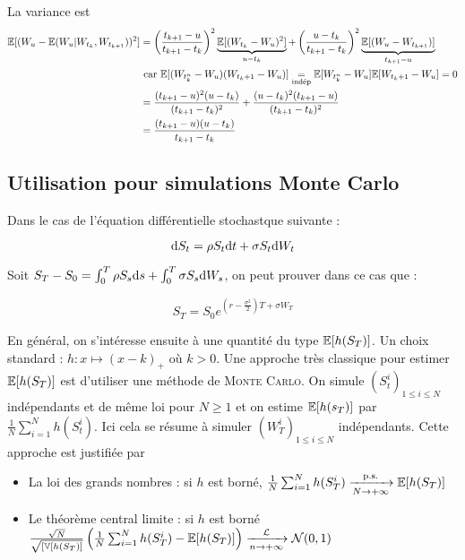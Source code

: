 La variance est 
\begin{equation*}
\begin{split}
  \mathbb{E}[(W_u - \mathbb{E}(W_u \vert W_{t_k}, W_{t_{k+1}}))^2] &= \left(\frac{t_{k+1} - u}{t_{k+1}-t_k}\right)^2  \underbrace{\mathbb{E}[(W_{t_k}-W_u)^2]}_{u-t_k} + \left( \frac{u-t_k}{t_{k+1} - t_k} \right)^2 \underbrace{\mathbb{E}[(W_u-W_{t_{k+1}})]}_{t_{k+1} - u} \\
  &\text{ car } \mathbb{E}[(W_{t_k^n} - W_u)(W_{t_k+1} - W_u)] \underset{\text{indép}}{=} \mathbb{E}[W_{t_k^n} - W_u]\mathbb{E}[W_{t_k+1} - W_u] = 0 \\ 
  &= \frac{(t_{k+1}-u)^2 (u-t_k)}{(t_{k+1} - t_k)^2} + \frac{(u-t_k)^2 (t_{k+1}-u)}{(t_{k+1} - t_k)^2} \\
  &= \frac{(t_{k+1}-u)(u-t_k)}{t_{k+1} - t_k}
\end{split}
\end{equation*}

\subsection{Utilisation pour simulations Monte Carlo}
Dans le cas de l'équation différentielle stochastque suivante :

\[ \mathrm{d} S_t = \rho S_t \mathrm{d} t + \sigma S_t \mathrm{d} W_t \]

Soit $S_T - S_0 = \int_{0}^{T} \rho S_s \mathrm{d} s + \int_{0}^{T} \sigma S_s \mathrm{d} W_s$, on peut prouver dans ce cas que :

\[ S_T = S_0 e^{\left(r- \frac{\sigma^2}{2}\right)T + \sigma W_T} \]

En général, on s'intéresse ensuite à une quantité du type $\mathbb{E}[h(S_T)]$. Un choix standard : $h : x \mapsto (x-k)_+$ où $k>0$. Une approche très classique pour estimer $\mathbb{E}[h(S_T)]$ est d'utiliser une méthode de \textsc{Monte Carlo}. On simule $(S_t^i)_{1\leq i \leq N}$ indépendants et de même loi pour $N \geq 1$ et on estime $\mathbb{E}[h(s_T)]$ par $ \frac{1}{N} \sum_{i=1}^{N} h(S_t^i)$. Ici cela se résume à simuler $(W_T^i)_{1 \leq i \leq N}$ indépendants. Cette approche est justifiée par 

\begin{itemize}
  \item La loi des grands nombres : si $h$ est borné, $ \frac{1}{N} \sum_{i=1}^{N} h(S_T^i) \xrightarrow[N\to +\infty]{\text{p.s.}} \mathbb{E}[h(S_T)]$
  \item Le théorème central limite : si $h$ est borné $ \frac{\sqrt{N}}{\sqrt{[\mathbb{V}[h(S_T)]}}\left( \frac{1}{N} \sum_{i=1}^{N} h(S_T^i) - \mathbb{E}[h(S_T)] \right) \xrightarrow[n\to +\infty]{\mathcal{L}} \mathcal{N}(0,1)$
\end{itemize}

